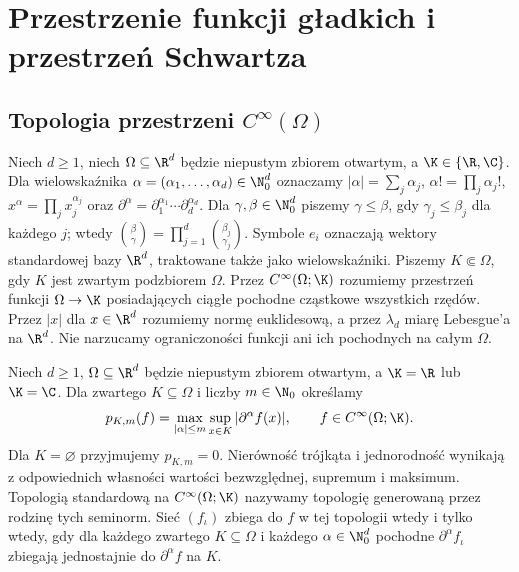\setcounter{section}{0}
\section{Przestrzenie funkcji gładkich i przestrzeń Schwartza}
\label{sec:gladkie-schwartz17}

\providecommand{\atlasref}[2]{#2}


\subsection{Topologia przestrzeni \texorpdfstring{$C^\infty(\Omega)$}{Cinfty(Omega)}}

Niech $d\ge1$, niech $\Omega\subseteq\R^d$ będzie niepustym zbiorem
otwartym, a $\K\in\{\R,\C\}$. Dla wielowskaźnika
$\alpha=(\alpha_1,\dots,\alpha_d)\in\N_0^d$ oznaczamy
$|\alpha|=\sum_j\alpha_j$, $\alpha!=\prod_j\alpha_j!$,
$x^\alpha=\prod_jx_j^{\alpha_j}$ oraz
$\partial^\alpha=\partial_1^{\alpha_1}\cdots\partial_d^{\alpha_d}$.
Dla $\gamma,\beta\in\N_0^d$ piszemy $\gamma\le\beta$,
gdy $\gamma_j\le\beta_j$ dla każdego $j$;
wtedy $\binom{\beta}{\gamma}=\prod_{j=1}^d\binom{\beta_j}{\gamma_j}$.
Symbole $e_i$ oznaczają wektory standardowej bazy $\R^d$,
traktowane także jako wielowskaźniki. Piszemy $K\Subset\Omega$,
gdy $K$ jest zwartym podzbiorem $\Omega$.
Przez $C^\infty(\Omega;\K)$ rozumiemy przestrzeń funkcji
$\Omega\to\K$ posiadających ciągłe pochodne cząstkowe wszystkich rzędów.
Przez $|x|$ dla $x\in\R^d$ rozumiemy normę euklidesową,
a przez $\lambda_d$ miarę Lebesgue'a na $\R^d$.
Nie narzucamy ograniczoności funkcji ani ich pochodnych na całym $\Omega$.

\begin{definicja}
\label{def:seminormy-cinf17}
Niech $d\ge1$, $\Omega\subseteq\R^d$ będzie niepustym zbiorem
otwartym, a $\K=\R$ lub $\K=\C$.
Dla zwartego $K\subseteq\Omega$ i liczby $m\in\N_0$ określamy
\[
 p_{K,m}(f)=\max_{|\alpha|\le m}\sup_{x\in K}|\partial^\alpha f(x)|,
 \qquad f\in C^\infty(\Omega;\K).
\]
Dla $K=\varnothing$ przyjmujemy $p_{K,m}=0$.
Nierówność trójkąta i jednorodność wynikają z odpowiednich
własności wartości bezwzględnej, supremum i maksimum.
Topologią standardową na $C^\infty(\Omega;\K)$ nazywamy
topologię generowaną przez rodzinę tych seminorm.
Sieć $(f_\iota)$ zbiega do $f$ w tej topologii wtedy i tylko wtedy,
gdy dla każdego zwartego $K\subseteq\Omega$ i każdego
$\alpha\in\N_0^d$ pochodne $\partial^\alpha f_\iota$
zbiegają jednostajnie do $\partial^\alpha f$ na $K$.
\end{definicja}

